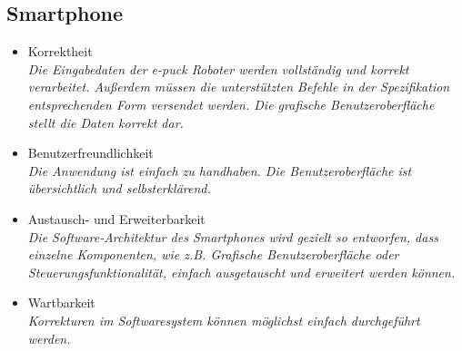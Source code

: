 \documentclass[10pt,a4paper]{article}
\begin{document}
		\subsection{Smartphone}
			\begin{itemize}
				\item Korrektheit
					\\ \textsl{Die Eingabedaten der e-puck Roboter werden vollständig und korrekt verarbeitet. Außerdem
						müssen die unterstützten Befehle in der Spezifikation entsprechenden Form versendet werden. Die grafische
						Benutzeroberfläche stellt die Daten korrekt dar.}
				\item Benutzerfreundlichkeit
					\\ \textsl{Die Anwendung ist einfach zu handhaben. Die Benutzeroberfläche ist übersichtlich und selbsterklärend. }
				\item Austausch- und Erweiterbarkeit
					\\ \textsl{Die Software-Architektur des Smartphones wird gezielt so entworfen, dass einzelne Komponenten, wie z.B. 
						Grafische Benutzeroberfläche oder Steuerungsfunktionalität, einfach ausgetauscht und erweitert werden können.}						
				\item Wartbarkeit
					\\ \textsl{Korrekturen im Softwaresystem können möglichst einfach durchgeführt werden.}			
			\end{itemize}
	
\end{document}
